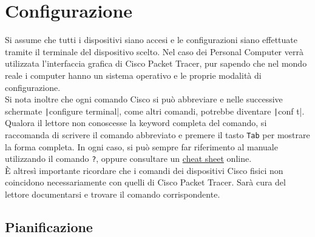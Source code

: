 \documentclass[a4paper,12pt]{report}
\begin{document}
\chapter{Configurazione}
Si assume che tutti i dispositivi siano accesi e le configurazioni siano effettuate tramite il terminale del dispositivo scelto.
%
Nel caso dei Personal Computer verrà utilizzata l'interfaccia grafica di Cisco Packet Tracer, pur sapendo che nel mondo reale i computer hanno un sistema operativo e le proprie modalità di configurazione.
%
\\Si nota inoltre che ogni comando Cisco si può abbreviare e nelle successive schermate \texttt|configure terminal|, come altri comandi, potrebbe diventare \texttt|conf t|.
%
Qualora il lettore non conoscesse la keyword completa del comando, si raccomanda di scrivere il comando abbreviato e premere il tasto \texttt{Tab} per mostrare la forma completa.
%
In ogni caso, si può sempre far riferimento al manuale utilizzando il comando \texttt{?}, oppure consultare un \href{https://www.websentra.com/cisco-commands-cheat-sheet/}{cheat sheet} online.
%
\\È altresì importante ricordare che i comandi dei dispositivi Cisco fisici non coincidono necessariamente con quelli di Cisco Packet Tracer.
%
Sarà cura del lettore documentarsi e trovare il comando corrispondente.
\section{Pianificazione}
\end{document}
